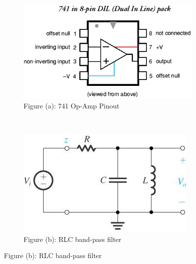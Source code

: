 \documentclass{article}
\begin{document}
\begin{CJK*}{UTF8}{bkai}
\begin{figure}[h]
    \begin{center}
        \begin{subfigure}[b]{0.4\textwidth}
            \includegraphics[width=\textwidth]{741Pinout.png}
            \caption*{Figure (a): 741 Op-Amp Pinout}
        \end{subfigure}
        ~
        \begin{subfigure}[b]{0.4\textwidth}
            \includegraphics[width=\textwidth]{BP.png}
            \caption*{Figure (b): RLC band-pass filter}
        \end{subfigure}
    \end{center}
\end{figure}


\end{CJK*}
\end{document}
